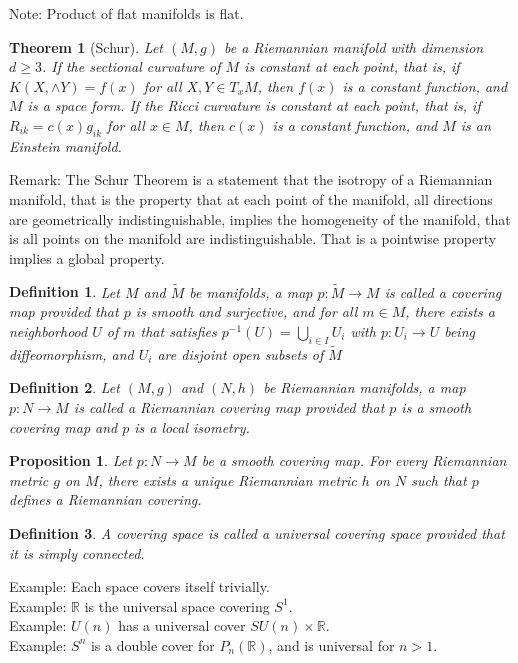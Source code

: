 \documentclass[11pt]{book}
\theoremstyle{break}
\theoremstyle{break}
\newtheorem{thm}{Theorem}[section]
\newtheorem{prop}[lem]{Proposition}
\newtheorem{defn}{Definition}[corL]
\newcommand{\R}{\mathbb{R}}
\newcommand{\that}[1]{\widetilde{#1}}
\newcommand{\note}{\color{red}Note: \color{black}}
\newcommand{\remark}{\color{blue}Remark: \color{black}}
\newcommand{\example}{\color{green}Example: \color{black}}
\begin{document}
\note Product of flat manifolds is flat. 

\begin{thm}[Schur]
Let $(M,g)$ be a Riemannian manifold with dimension $d \geq 3$. If the sectional curvature of $M$ is constant at each point, that is, if $K(X,\wedge Y) = f(x)$ for all $X,Y \in T_xM$, then $f(x)$ is a constant function, and $M$ is a space form. If the Ricci curvature is constant at each point, that is, if $R_{ik} = c(x) g_{ik}$ for all $x \in M$, then $c(x)$ is a constant function, and $M$ is an Einstein manifold. 
\end{thm}
\remark The Schur Theorem is a statement that the isotropy of a Riemannian manifold, that is the property that at each point of the manifold, all directions are geometrically indistinguishable, implies the homogeneity of the manifold, that is all points on the manifold are indistinguishable. That is a pointwise property implies a global property. \\


\begin{defn}
Let $M$ and $\that{M}$ be manifolds, a map $p:\that{M} \to M$ is called a covering map provided that $p$ is smooth and surjective, and for all $m\in M$, there exists a neighborhood $U$ of $m$ that satisfies $p^{-1}(U) = \bigcup_{i \in I}U_i$ with $p:U_i \to U$ being diffeomorphism, and $U_i$ are disjoint open subsets of $\that{M}$
\end{defn}


\begin{defn}
Let $(M,g)$ and $(N,h)$ be Riemannian manifolds, a map $p:N \to M$ is called a Riemannian covering map provided that $p$ is a smooth covering map and $p$ is a local isometry. 
\end{defn}


\begin{prop}
Let $p:N \to M$ be a smooth covering map. For every Riemannian metric $g$ on $M$, there exists a unique Riemannian metric $h$ on $N$ such that $p$ defines a Riemannian covering. 
\end{prop}

\begin{defn}
A covering space is called a universal covering space provided that it is simply connected.
\end{defn}

\example Each space covers itself trivially. \\
\example $\R$ is the universal space covering $S^1$. \\
\example $U(n)$ has a universal cover $SU(n) \times \R$.\\
\example $S^n$ is a double cover for $P_n(\R)$, and is universal for $n> 1$. \\
\end{document}
